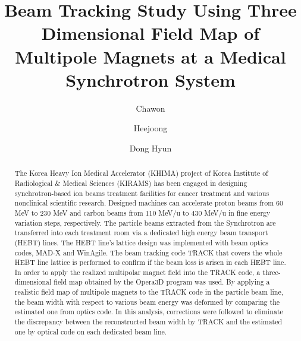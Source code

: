 \documentclass[jkps,preprint,fleqn,showpacs,showkeys,10pt,twocolumn]{revtex4}
\begin{document}
\setcounter{page}{1}
\title[]{Beam Tracking Study Using Three Dimensional Field Map of Multipole Magnets at a Medical Synchrotron System}
\author{Chawon }
\author{Heejoong }
\author{Dong Hyun }
\begin{abstract}
  The Korea Heavy Ion Medical Accelerator (KHIMA) project of Korea Institute of Radiological \& Medical Sciences (KIRAMS) has been engaged in
  designing synchrotron-based ion beams treatment facilities for cancer treatment and various nonclinical scientific research.
  Designed machines can accelerate proton beams from 60 MeV to 230 MeV
  and carbon beams from 110 MeV/u to 430 MeV/u in fine energy variation steps, respectively.
  The particle beams extracted from the Synchrotron are transferred into each treatment room via a dedicated high energy beam transport (HEBT) lines.
  The HEBT line's lattice design was implemented with beam optics codes, MAD-X and WinAgile.  
  The beam tracking code TRACK that covers the whole HEBT line lattice is performed to confirm if the beam loss is arisen in each HEBT line.  
  In order to apply the realized multipolar magnet field into the TRACK code, a three-dimensional field map obtained by the Opera3D program was used.
  By applying a realistic field map of multipole magnets to the TRACK code in the particle beam line,  
  the beam width with respect to various beam energy was deformed by comparing the estimated one from optics code.
  In this analysis, corrections were followed to eliminate the discrepancy between the reconstructed beam width by TRACK
  and the estimated one by optical code on each dedicated beam line.
\end{abstract}
\end{document}
